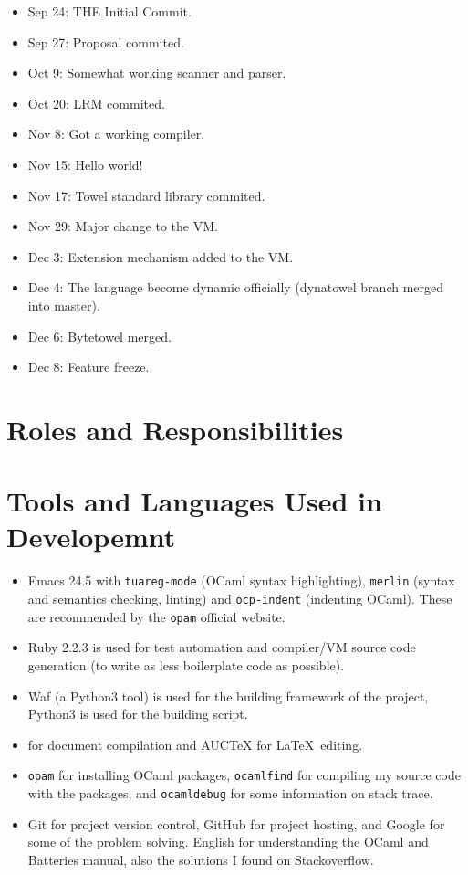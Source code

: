 \documentclass{report}
\begin{document}
\begin{itemize}
\item Sep 24: THE Initial Commit.
\item Sep 27: Proposal commited.
\item Oct 9: Somewhat working scanner and parser.
\item Oct 20: LRM commited.
\item Nov 8: Got a working compiler.
\item Nov 15: Hello world!
\item Nov 17: Towel standard library commited.
\item Nov 29: Major change to the VM.
\item Dec 3: Extension mechanism added to the VM.
\item Dec 4: The language become dynamic officially (dynatowel branch merged into master).
\item Dec 6: Bytetowel merged.
\item Dec 8: Feature freeze.
\end{itemize}

\section{Roles and Responsibilities}

\section{Tools and Languages Used in Developemnt}

\begin{itemize}
\item Emacs 24.5 with \texttt{tuareg-mode} (OCaml syntax
  highlighting), \texttt{merlin} (syntax and semantics checking,
  linting) and \texttt{ocp-indent} (indenting OCaml). These are
  recommended by the \texttt{opam} official website.

\item Ruby 2.2.3 is used for test automation and compiler/VM source code
  generation (to write as less boilerplate code as possible).

\item Waf (a Python3 tool) is used for the building framework of the
  project, Python3 is used for the building script.

\item \XeTeX{} for document compilation and AUCTeX for \LaTeX ~editing.

\item \texttt{opam} for installing OCaml packages, \texttt{ocamlfind} for compiling my source code with the packages, and \texttt{ocamldebug} for some information on stack trace.

\item Git for project version control, GitHub for project hosting, and Google for some of the problem solving. English for understanding the OCaml and Batteries manual, also the solutions I found on Stackoverflow.
\end{itemize}
\end{document}
